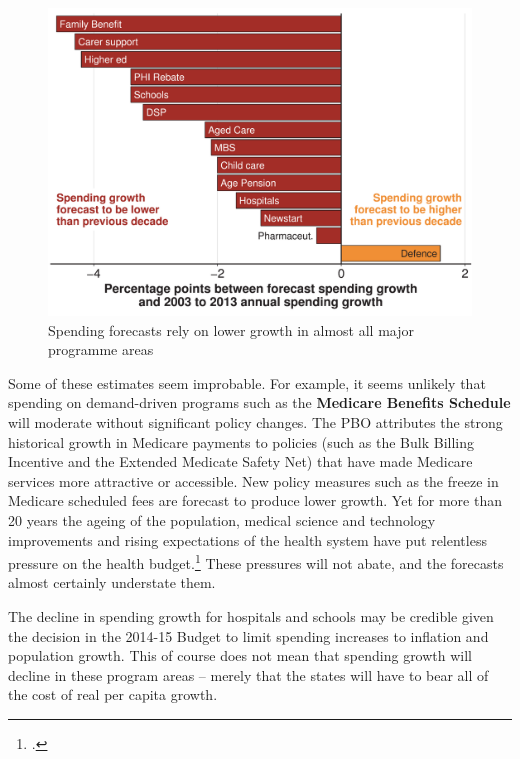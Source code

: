 \begin{figure}
\caption{Spending forecasts rely on lower growth in almost all major programme areas\label{fig:FISCAL-8}}%
\includegraphics[width=\columnwidth]{Fiscal-challenges/figure/Figure8-altered-1.pdf}

\end{figure}

Some of these estimates seem improbable. For example, it seems unlikely that spending on demand-driven programs such as the \textbf{Medicare Benefits Schedule} will moderate without significant policy changes. The PBO attributes the strong historical growth in Medicare payments to policies (such as the Bulk Billing Incentive and the Extended Medicate Safety Net) that have made Medicare services more attractive or accessible. New policy measures such as the freeze in Medicare scheduled fees are forecast to produce lower growth. Yet for more than 20 years the ageing of the population, medical science and technology improvements and rising expectations of the health system have put relentless pressure on the health budget.\footcite{Daley2014}  These pressures will not abate, and the forecasts almost certainly understate them.

The decline in spending growth for hospitals and schools may be credible given the decision in the 2014-15 Budget to limit spending increases to inflation and population growth. This of course does not mean that spending growth will decline in these program areas – merely that the states will have to bear all of the cost of real per capita growth.

